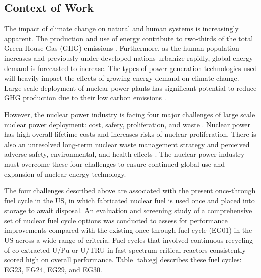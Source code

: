 \subsection{Context of Work}
The impact of climate change on natural and human systems 
is increasingly apparent.
The production and use of energy contribute to 
two-thirds of the total Green House Gas (GHG) 
emissions \cite{noauthor_climate_2018}.
Furthermore, as the human population increases and previously 
under-developed nations urbanize rapidly, 
global energy demand is forecasted to increase.  
The types of power generation technologies used 
will heavily impact the effects of growing energy demand 
on climate change.  
Large scale deployment of nuclear power plants has significant 
potential to reduce GHG production due to their low 
carbon emissions \cite{noauthor_climate_2018}.  

However, the nuclear power industry is facing four major challenges 
of large scale nuclear power deployment: 
cost, safety, proliferation, and waste 
\cite{massachusetts_institute_of_technology_future_2003}. 
Nuclear power has high overall lifetime costs and increases 
risks of nuclear proliferation. 
There is also an unresolved long-term nuclear waste management 
strategy and perceived adverse safety, environmental, and health 
effects \cite{massachusetts_institute_of_technology_future_2003}. 
The nuclear power industry must overcome these four challenges 
to ensure continued global use and expansion 
of nuclear energy technology. 

The four challenges described above are associated with 
the present once-through fuel cycle in the \gls{US}, 
in which fabricated nuclear fuel is used once and placed into 
storage to await disposal. 
An evaluation and screening study of a comprehensive set of nuclear 
fuel cycle options \cite{wigeland_nuclear_2014} was conducted to assess 
for performance improvements compared with the existing once-through 
fuel cycle (EG01) in the \gls{US} across a wide range of criteria. 
Fuel cycles that involved continuous recycling
of co-extracted U/Pu or U/TRU in fast spectrum critical reactors
consistently scored high on overall performance.  
Table \ref{tab:eg} describes these fuel cycles:
EG23, EG24, EG29, and EG30. 

